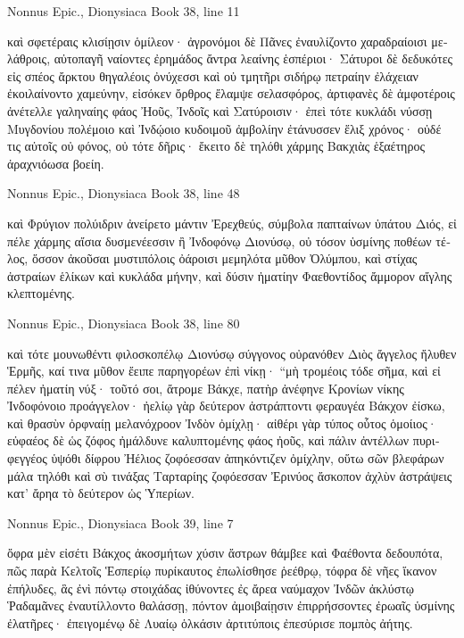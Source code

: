 \documentclass[12pt,letterpaper,twoside,final]{memoir}
\begin{document}
\begin{greek}
Nonnus Epic., Dionysiaca 
Book 38, line 11

καὶ σφετέραις κλισίῃσιν ὁμίλεον· ἀγρονόμοι δὲ 
Πᾶνες ἐναυλίζοντο χαραδραίοισι μελάθροις, 
αὐτοπαγῆ ναίοντες ἐρημάδος ἄντρα λεαίνης 
ἑσπέριοι· Σάτυροι δὲ δεδυκότες εἰς σπέος ἄρκτου 
θηγαλέοις ὀνύχεσσι καὶ οὐ τμητῆρι σιδήρῳ 
πετραίην ἐλάχειαν ἐκοιλαίνοντο χαμεύνην, 
εἰσόκεν ὄρθρος ἔλαμψε σελασφόρος, ἀρτιφανὲς δὲ 
ἀμφοτέροις ἀνέτελλε γαληναίης φάος Ἠοῦς, 
Ἰνδοῖς καὶ Σατύροισιν· ἐπεὶ τότε κυκλάδι νύσσῃ 
Μυγδονίου πολέμοιο καὶ Ἰνδῴοιο κυδοιμοῦ 
ἀμβολίην ἐτάνυσσεν ἕλιξ χρόνος· οὐδέ τις αὐτοῖς 
οὐ φόνος, οὐ τότε δῆρις· ἔκειτο δὲ τηλόθι χάρμης 
Βακχιὰς ἑξαέτηρος ἀραχνιόωσα βοείη. 



Nonnus Epic., Dionysiaca 
Book 38, line 48

καὶ Φρύγιον πολύιδριν ἀνείρετο μάντιν Ἐρεχθεύς, 
σύμβολα παπταίνων ὑπάτου Διός, εἰ πέλε χάρμης 
αἴσια δυσμενέεσσιν ἢ Ἰνδοφόνῳ Διονύσῳ, 
οὐ τόσον ὑσμίνης ποθέων τέλος, ὅσσον ἀκοῦσαι 
μυστιπόλοις ὀάροισι μεμηλότα μῦθον Ὀλύμπου, 
καὶ στίχας ἀστραίων ἑλίκων καὶ κυκλάδα μήνην, 
καὶ δύσιν ἠματίην Φαεθοντίδος ἄμμορον αἴγλης 
κλεπτομένης. 



Nonnus Epic., Dionysiaca 
Book 38, line 80

καὶ τότε μουνωθέντι φιλοσκοπέλῳ Διονύσῳ 
σύγγονος οὐρανόθεν Διὸς ἄγγελος ἤλυθεν Ἑρμῆς, 
καί τινα μῦθον ἔειπε παρηγορέων ἐπὶ νίκῃ· 
 “μὴ τρομέοις τόδε σῆμα, καὶ εἰ πέλεν ἠματίη νύξ· 
τοῦτό σοι, ἄτρομε Βάκχε, πατὴρ ἀνέφηνε Κρονίων 
νίκης Ἰνδοφόνοιο προάγγελον· ἠελίῳ γὰρ 
δεύτερον ἀστράπτοντι φεραυγέα Βάκχον ἐίσκω, 
καὶ θρασὺν ὀρφναίῃ μελανόχροον Ἰνδὸν ὀμίχλῃ· 
αἰθέρι γὰρ τύπος οὗτος ὁμοίιος· εὐφαέος δὲ 
ὡς ζόφος ἠμάλδυνε καλυπτομένης φάος ἠοῦς, 
καὶ πάλιν ἀντέλλων πυριφεγγέος ὑψόθι δίφρου 
Ἠέλιος ζοφόεσσαν ἀπηκόντιζεν ὀμίχλην, 
οὕτω σῶν βλεφάρων μάλα τηλόθι καὶ σὺ τινάξας 
Ταρταρίης ζοφόεσσαν Ἐρινύος ἄσκοπον ἀχλὺν 
ἀστράψεις κατ' ἄρηα τὸ δεύτερον ὡς Ὑπερίων. 



Nonnus Epic., Dionysiaca 
Book 39, line 7

ὄφρα μὲν εἰσέτι Βάκχος ἀκοσμήτων χύσιν ἄστρων 
θάμβεε καὶ Φαέθοντα δεδουπότα, πῶς παρὰ Κελτοῖς 
Ἑσπερίῳ πυρίκαυτος ἐπωλίσθησε ῥεέθρῳ, 
τόφρα δὲ νῆες ἵκανον ἐπήλυδες, ἃς ἐνὶ πόντῳ 
στοιχάδας ἰθύνοντες ἐς ἄρεα ναύμαχον Ἰνδῶν 
ἀκλύστῳ Ῥαδαμᾶνες ἐναυτίλλοντο θαλάσσῃ, 
πόντον ἀμοιβαίῃσιν ἐπιρρήσσοντες ἐρωαῖς 
ὑσμίνης ἐλατῆρες· ἐπειγομένῳ δὲ Λυαίῳ 
ὁλκάσιν ἀρτιτύποις ἐπεσύρισε πομπὸς ἀήτης. 




\end{greek}
\end{document}
